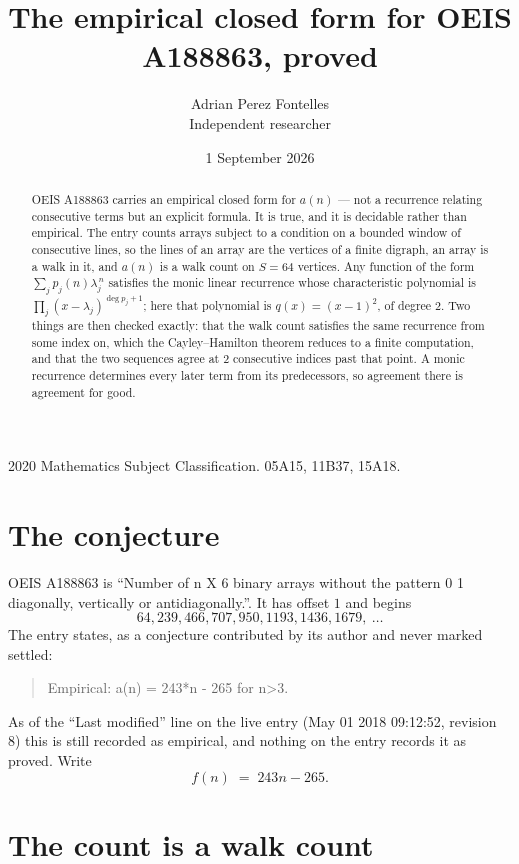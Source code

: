 \documentclass[11pt,a4paper]{article}
\title{The empirical closed form for OEIS A188863, proved}
\author{Adrian Perez Fontelles\\ \small Independent researcher}
\date{1 September 2026}
\theoremstyle{plain}
\theoremstyle{definition}
\begin{document}
\maketitle

\begin{abstract}
OEIS A188863 carries an empirical closed form for $a(n)$ --- not a recurrence relating
consecutive terms but an explicit formula. It is true, and it is decidable rather than
empirical. The entry counts arrays subject to a condition on a bounded window of consecutive lines, so the lines of an array are the
vertices of a finite digraph, an array is a walk in it, and $a(n)$ is a walk count on
$S=64$ vertices. Any function of the form $\sum_j p_j(n)\lambda_j^{\,n}$ satisfies the
monic linear recurrence whose characteristic polynomial is
$\prod_j(x-\lambda_j)^{\deg p_j+1}$; here that polynomial is $q(x)=(x-1)^{2}$, of degree
$2$. Two things are then checked exactly: that the walk count satisfies the same
recurrence from some index on, which the Cayley--Hamilton theorem reduces to a finite
computation, and that the two sequences agree at $2$ consecutive indices past that
point. A monic recurrence determines every later term from its predecessors, so agreement
there is agreement for good.
\end{abstract}

\noindent\small 2020 Mathematics Subject Classification. 05A15, 11B37, 15A18.\normalsize

\section{The conjecture}

OEIS A188863 is ``Number of n X 6 binary arrays without the pattern 0 1 diagonally, vertically or antidiagonally.''. It has offset $1$ and begins
\[
64, 239, 466, 707, 950, 1193, 1436, 1679,\ \dots
\]
The entry states, as a conjecture contributed by its author and never marked settled:
\begin{quote}
Empirical: a(n) = 243*n - 265 for n>3.
\end{quote}
As of the ``Last modified'' line on the live entry (May 01 2018 09:12:52, revision 8) this is still
recorded as empirical, and nothing on the entry records it as proved. Write
\[
f(n)\;=\;243 n - 265.
\]

\section{The count is a walk count}
\end{document}
